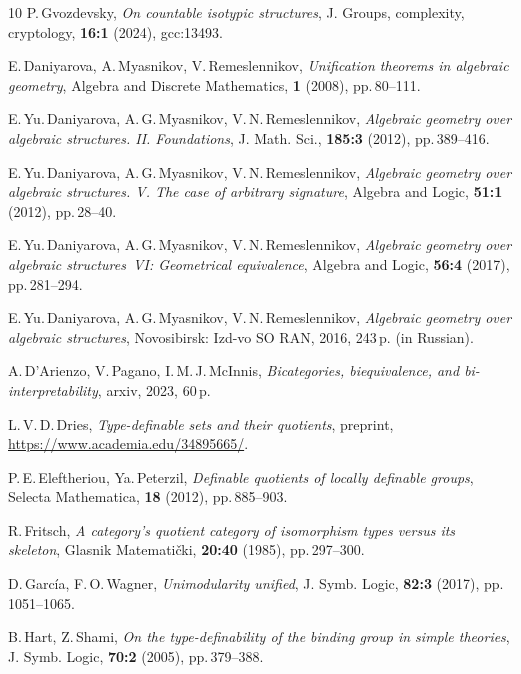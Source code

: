 \documentclass[12pt]{article}
\theoremstyle{definition}
\begin{document}
\begin{thebibliography}{10}
P.\,Gvozdevsky, {\it On countable isotypic structures}, J. Groups, complexity, cryptology, {\bf 16:1} (2024), gcc:13493.

E.\,Daniyarova, A.\,Myasnikov, V.\,Remeslennikov, {\it Unification theorems in algebraic geometry}, Algebra and Discrete Mathematics, {\bf 1} (2008), pp.\,80--111.

E.\,Yu.\,Daniyarova, A.\,G.\,Myasnikov, V.\,N.\,Remeslennikov, {\it Algebraic geometry over algebraic structures. II. Foundations}, J. Math. Sci., {\bf 185:3} (2012), pp.\,389--416.

E.\,Yu.\,Daniyarova, A.\,G.\,Myasnikov, V.\,N.\,Remeslennikov, {\it Algebraic geometry over algebraic structures. V. The case of arbitrary signature}, Algebra and Logic, {\bf 51:1} (2012), pp.\,28--40.

E.\,Yu.\,Daniyarova, A.\,G.\,Myasnikov, V.\,N.\,Remeslennikov, {\it Algebraic geometry over algebraic structures~VI: Geometrical equivalence}, Algebra and Logic, {\bf 56:4} (2017), pp.\,281--294.

E.\,Yu.\,Daniyarova, A.\,G.\,Myasnikov, V.\,N.\,Remeslennikov, {\it Algebraic geometry over algebraic structures}, Novosibirsk: Izd-vo SO RAN, 2016, 243\,p. (in Russian).

A.\,D'Arienzo, V.\,Pagano, I.\,M.\,J.\,McInnis, {\it Bicategories, biequivalence, and bi-interpretability}, arxiv, 2023, 60\,p.

L.\,V.\,D.\,Dries, {\it Type-definable sets and their quotients}, preprint, \\ \href{https://www.academia.edu/34895665/TYPE-DEFINABLE_SETS_AND_THEIR_QUOTIENTS}{https://www.academia.edu/34895665/}.

P.\,E.\,Eleftheriou, Ya.\,Peterzil, 
{\it Definable quotients of locally definable groups}, Selecta Mathematica, {\bf 18} (2012), pp.\,885--903.

R.\,Fritsch, {\it A category's quotient category of isomorphism types versus its skeleton}, Glasnik Matemati\v{c}ki, {\bf 20:40} (1985), pp.\,297--300.

D.\,Garc\'{i}a, F.\,O.\,Wagner, {\it Unimodularity unified}, J. Symb. Logic, {\bf 82:3} (2017), pp.\,1051--1065.

B.\,Hart, Z.\,Shami, {\it
On the type-definability of the binding group in simple theories}, J. Symb. Logic, {\bf 70:2} (2005), pp.\,379--388.


\end{thebibliography}
\end{document}
